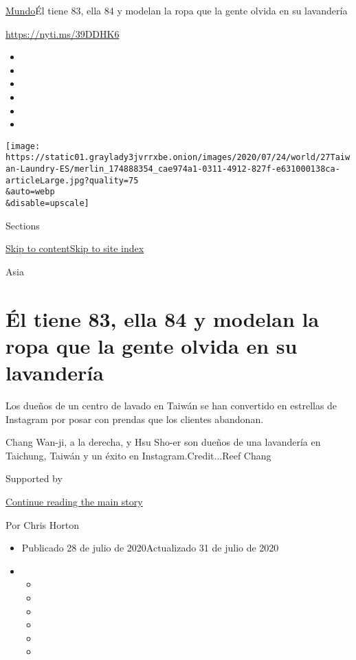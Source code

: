\href{/es/section/mundo}{Mundo}\textbar{}Él tiene 83, ella 84 y modelan
la ropa que la gente olvida en su lavandería

\url{https://nyti.ms/39DDHK6}

\begin{itemize}
\item
\item
\item
\item
\item
\item
\end{itemize}

\texttt{[image: https://static01.graylady3jvrrxbe.onion/images/2020/07/24/world/27Taiwan-Laundry-ES/merlin\_174888354\_cae974a1-0311-4912-827f-e631000138ca-articleLarge.jpg?quality=75\\\&auto=webp\\\&disable=upscale]}

Sections

\protect\hyperlink{site-content}{Skip to
content}\protect\hyperlink{site-index}{Skip to site index}

Asia

\hypertarget{uxe9l-tiene-83-ella-84-y-modelan-la-ropa-que-la-gente-olvida-en-su-lavanderuxeda}{%
\section{Él tiene 83, ella 84 y modelan la ropa que la gente olvida en
su
lavandería}\label{uxe9l-tiene-83-ella-84-y-modelan-la-ropa-que-la-gente-olvida-en-su-lavanderuxeda}}

Los dueños de un centro de lavado en Taiwán se han convertido en
estrellas de Instagram por posar con prendas que los clientes abandonan.

Chang Wan-ji, a la derecha, y Hsu Sho-er son dueños de una lavandería en
Taichung, Taiwán y un éxito en Instagram.Credit...Reef Chang

Supported by

\protect\hyperlink{after-sponsor}{Continue reading the main story}

Por Chris Horton

\begin{itemize}
\item
  Publicado 28 de julio de 2020Actualizado 31 de julio de 2020
\item
  \begin{itemize}
  \item
  \item
  \item
  \item
  \item
  \item
  \end{itemize}
\end{itemize}

